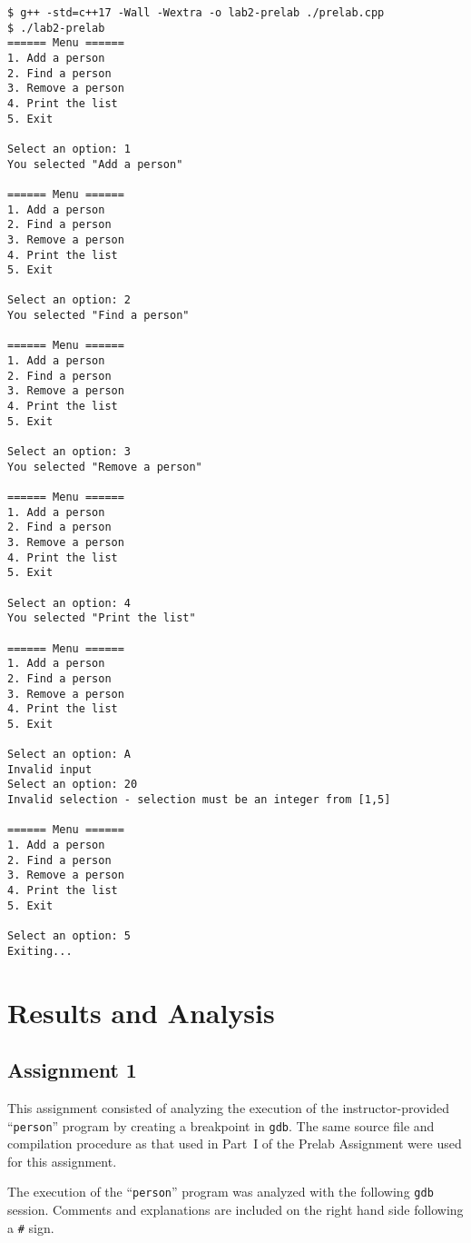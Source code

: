 \documentclass[11pt, letterpaper]{article} %
\begin{document}
\begin{lstlisting}[style=labreportstyle-sh]
$ g++ -std=c++17 -Wall -Wextra -o lab2-prelab ./prelab.cpp
$ ./lab2-prelab
====== Menu ======
1. Add a person
2. Find a person
3. Remove a person
4. Print the list
5. Exit

Select an option: 1
You selected "Add a person"

====== Menu ======
1. Add a person
2. Find a person
3. Remove a person
4. Print the list
5. Exit

Select an option: 2
You selected "Find a person"

====== Menu ======
1. Add a person
2. Find a person
3. Remove a person
4. Print the list
5. Exit

Select an option: 3
You selected "Remove a person"

====== Menu ======
1. Add a person
2. Find a person
3. Remove a person
4. Print the list
5. Exit

Select an option: 4
You selected "Print the list"

====== Menu ======
1. Add a person
2. Find a person
3. Remove a person
4. Print the list
5. Exit

Select an option: A
Invalid input
Select an option: 20
Invalid selection - selection must be an integer from [1,5]

====== Menu ======
1. Add a person
2. Find a person
3. Remove a person
4. Print the list
5. Exit

Select an option: 5
Exiting...
\end{lstlisting}

\section*{Results and Analysis}

\subsection*{Assignment 1}

This assignment consisted of analyzing the execution of the instructor-provided ``\texttt{person}'' program by creating a breakpoint in \texttt{gdb}. The same source file and compilation procedure as that used in Part~I of the Prelab Assignment were used for this assignment.

The execution of the ``\texttt{person}'' program was analyzed with the following \texttt{gdb} session. Comments and explanations are included on the right hand side following a \texttt{\#} sign.
\end{document}
